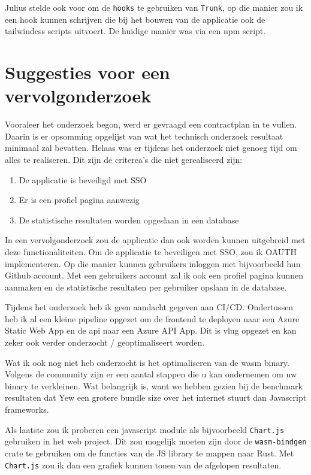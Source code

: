 Julius stelde ook voor om de \texttt{hooks} te gebruiken van \texttt{Trunk}, op
die manier zou ik een hook kunnen schrijven die bij het bouwen van de applicatie ook de tailwindcss
scripts uitvoert. De huidige manier was via een npm script.

\section{Suggesties voor een vervolgonderzoek}

Vooraleer het onderzoek begon, werd er gevraagd een contractplan in te vullen. Daarin is er
opsomming opgelijst van wat het technisch onderzoek resultaat minimaal zal bevatten. Helaas was er
tijdens het onderzoek niet genoeg tijd om alles te realiseren. Dit zijn de criterea's die niet
gerealiseerd zijn:
\begin{enumerate}
  \item De applicatie is beveiligd met SSO
  \item Er is een profiel pagina aanwezig
  \item De statistische resultaten worden opgeslaan in een database
\end{enumerate}
In een vervolgonderzoek zou de applicatie dan ook worden kunnen uitgebreid met deze
functionaliteiten. Om de applicatie te beveiligen met SSO, zou ik OAUTH implementeren. Op die manier
kunnen gebruikers inloggen met bijvoorbeeld hun Github account.  Met een gebruikers account zal ik
ook een profiel pagina kunnen aanmaken en de statistische resultaten per gebruiker opslaan in de
database.

Tijdens het onderzoek heb ik geen aandacht gegeven aan CI/CD. Ondertussen heb ik al een kleine
pipeline opgezet om de frontend te deployen naar een Azure Static Web App en de api naar een Azure
API App. Dit is vlug opgezet en kan zeker ook verder onderzocht / geoptimaliseert worden.

Wat ik ook nog niet heb onderzocht is het optimaliseren van de wasm binary.\cite{wasm_size} Volgens
de community zijn er een aantal stappen die u kan ondernemen om uw binary te verkleinen. Wat
belangrijk is, want we hebben gezien bij de benchmark resultaten dat Yew een grotere bundle size
over het internet stuurt dan Javascript frameworks.

Als laatste zou ik proberen een javascript module als bijvoorbeeld \texttt{Chart.js}
gebruiken in het web project. Dit zou mogelijk moeten zijn door de \texttt{wasm-bindgen}
crate te gebruiken om de functies van de JS library te mappen naar Rust. Met
\texttt{Chart.js} zou ik dan een grafiek kunnen tonen van de afgelopen resultaten.
